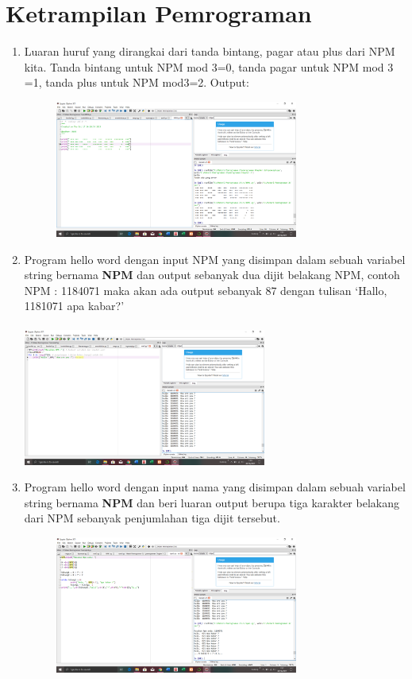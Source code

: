\documentclass{article}
\begin{document}
\section{Ketrampilan Pemrograman}
\begin{enumerate}
\item
Luaran huruf yang dirangkai dari tanda bintang, pagar atau plus dari NPM kita.
Tanda bintang untuk NPM mod 3=0, tanda pagar untuk NPM mod 3 =1, tanda plus untuk NPM mod3=2.
Output:
\begin{figure}[h]
\centerline{\includegraphics[width=8cm]{figures/NPM11.png}}
\end{figure}


\item
Program hello word dengan input NPM yang disimpan dalam sebuah variabel string bernama \textbf{NPM} dan output sebanyak dua dijit belakang NPM, 
contoh NPM : 1184071 maka akan ada output sebanyak 87 dengan tulisan `Hallo, 1181071 apa kabar?'
\paragraph{}
\centerline{\includegraphics[width=8cm]{figures/soal2.png}}


\item
Program hello word dengan input nama yang disimpan dalam sebuah variabel string bernama \textbf{NPM} dan beri luaran output berupa tiga karakter belakang dari NPM sebanyak penjumlahan tiga dijit tersebut.
\begin{figure}[h]
\centerline{\includegraphics[width=8cm]{figures/npm3.png}}
\end{figure}



\end{enumerate}
\end{document}
